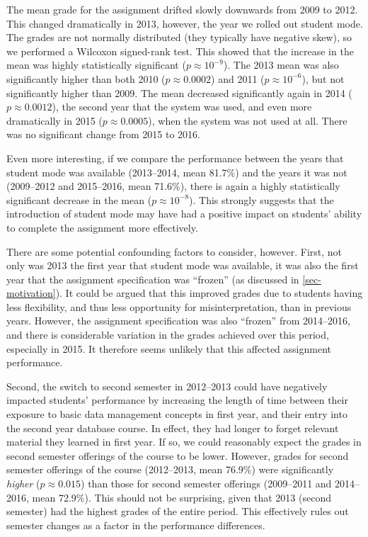 \documentclass[sigconf, authordraft, capitalise]{acmart}
\begin{document}
The mean grade for the assignment drifted slowly downwards from 2009 to 2012. This changed dramatically in 2013, however, the year we rolled out student mode. The grades are not normally distributed (they typically have negative skew), so we performed a Wilcoxon signed-rank test. This showed that the increase in the mean was highly statistically significant (\(p \approx 10^{-9}\)). The 2013 mean was also significantly higher than both 2010 (\(p \approx 0.0002\)) and 2011 (\(p \approx 10^{-6}\)), but not significantly higher than 2009. The mean decreased significantly again in 2014 (\(p \approx 0.0012\)), the second year that the system was used, and even more dramatically in 2015 (\(p \approx 0.0005\)), when the system was not used at all. There was no significant change from 2015 to 2016.

Even more interesting, if we compare the performance between the years that student mode was available (2013--2014, mean 81.7\%) and the years it was not (2009--2012 and 2015--2016, mean 71.6\%), there is again a highly statistically significant decrease in the mean (\(p \approx 10^{-8}\)). This strongly suggests that the introduction of student mode may have had a positive impact on students' ability to complete the assignment more effectively.

There are some potential confounding factors to consider, however. First, not only was 2013 the first year that student mode was available, it was also the first year that the assignment specification was ``frozen'' (as discussed in \cref{sec-motivation}). It could be argued that this improved grades due to students having less flexibility, and thus less opportunity for misinterpretation, than in previous years. However, the assignment specification was also ``frozen'' from 2014--2016, and there is considerable variation in the grades achieved over this period, especially in 2015. It therefore seems unlikely that this affected assignment performance.

Second, the switch to second semester in 2012--2013 could have negatively impacted students' performance by increasing the length of time between their exposure to basic data management concepts in first year, and their entry into the second year database course. In effect, they had longer to forget relevant material they learned in first year. If so, we could reasonably expect the grades in second semester offerings of the course to be lower. However, grades for second semester offerings of the course (2012--2013, mean 76.9\%) were significantly \emph{higher} (\(p \approx 0.015\)) than those for second semester offerings (2009--2011 and 2014--2016, mean 72.9\%). This should not be surprising, given that 2013 (second semester) had the highest grades of the entire period. This effectively rules out semester changes as a factor in the performance differences.
\end{document}
